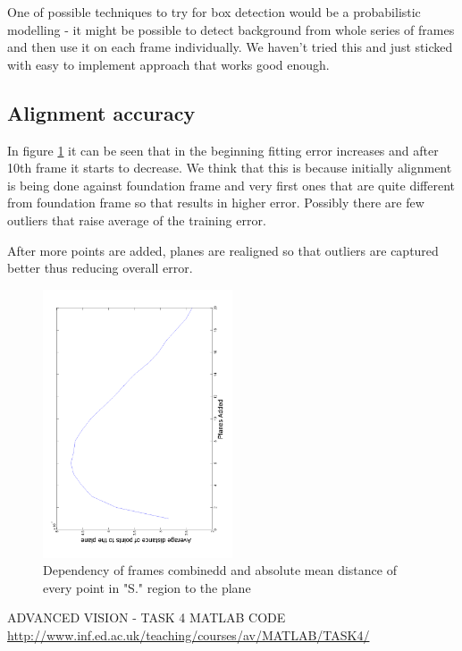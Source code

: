 \documentclass[12pt,a4paper,onecolumn]{article}
\begin{document}
One of possible techniques to try for box detection
would be a probabilistic modelling - it might be possible
to detect background from whole series of frames
and then use it on each frame individually. 
We haven't tried this and just sticked with
easy to implement approach that works good enough.


\subsection{Alignment accuracy}
In figure \ref{fig:plane_angle_error_versus_foundation_plane} it
can be seen that in the beginning fitting error increases and
after 10th frame it starts to decrease. We think that this is because
initially alignment is being done against foundation frame and
very first ones that are quite different from foundation frame
so that results in higher error. Possibly there are few outliers
that raise average of the training error.

After more points are added, planes are realigned so that outliers
are captured better thus reducing overall error.
\begin{figure}[h]
  \centering
  \includegraphics[width=0.5\textwidth]{figs/plane_angle_error_versus_foundation_plane}
  \caption{Dependency of frames combinedd and absolute mean distance of every point in "S." region to the plane}
  \label{fig:plane_angle_error_versus_foundation_plane}
\end{figure}

\begin{thebibliography}{9}
  
  ADVANCED VISION - TASK 4 MATLAB CODE
  \url{http://www.inf.ed.ac.uk/teaching/courses/av/MATLAB/TASK4/} 
  
\end{thebibliography}
\end{document}
